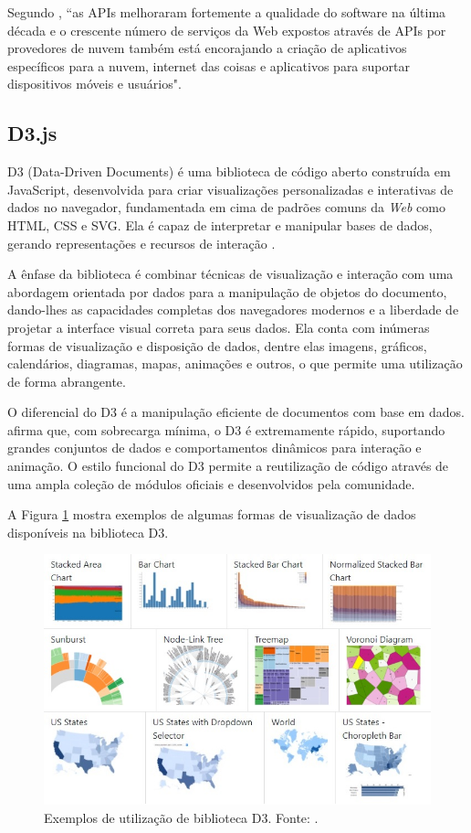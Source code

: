\documentclass[12pt]{article}
\begin{document}
Segundo \citet{techtarget}, ``as APIs melhoraram fortemente a qualidade do software na última década e o crescente número de serviços da Web expostos através de APIs por provedores de nuvem também está encorajando a criação de aplicativos específicos para a nuvem, internet das coisas e aplicativos para suportar dispositivos móveis e usuários".

\subsection{D3.js}

D3 (Data-Driven Documents) é uma biblioteca de código aberto construída em JavaScript, desenvolvida para criar visualizações personalizadas e interativas de dados no navegador, fundamentada em cima de padrões comuns da \emph{Web} como HTML, CSS e SVG. Ela é capaz de interpretar e manipular bases de dados, gerando representações e recursos de interação \citep{d3}.

A ênfase da biblioteca é combinar técnicas de visualização e interação com uma abordagem orientada por dados para a manipulação de objetos do documento, dando-lhes as capacidades completas dos navegadores modernos e a liberdade de projetar a interface visual correta para seus dados. Ela conta com inúmeras formas de visualização e disposição de dados, dentre elas imagens, gráficos, calendários, diagramas, mapas, animações e outros, o que permite uma utilização de forma abrangente.

O diferencial do D3 é a manipulação eficiente de documentos com base em dados. \citet{d3} afirma que, com sobrecarga mínima, o D3 é extremamente rápido, suportando grandes conjuntos de dados e comportamentos dinâmicos para interação e animação. O estilo funcional do D3 permite a reutilização de código através de uma ampla coleção de módulos oficiais e desenvolvidos pela comunidade.

A Figura \ref{d3example} mostra exemplos de algumas formas de visualização de dados disponíveis na biblioteca D3.

\begin{figure}[!h]
\centering
\includegraphics[scale=0.74]{d3-examples.jpg}
\caption{Exemplos de utilização de biblioteca D3. Fonte: \citet{d3}.}
\label{d3example}
\end{figure}
\end{document}
